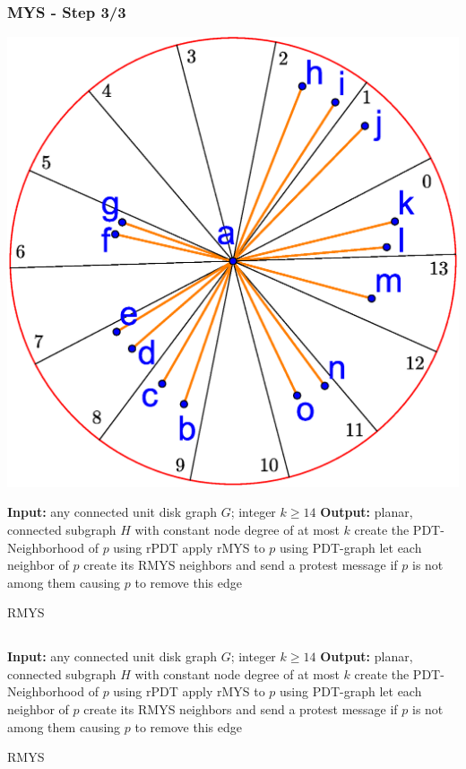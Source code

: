 \documentclass[compress]{beamer}
\begin{document}
\begin{frame} 
\frametitle{MYS - Step 3/3}
	\center \includegraphics[width=0.65\linewidth]{RMYS_3.eps}
\end{frame}

\begin{frame}
\begin{algorithm}[H]
\begin{algorithmic}[0]
\STATE \textbf{Input:} any connected unit disk graph $G $; integer $k\geq 14 $
\STATE \textbf{Output:} planar, connected subgraph $H $ with constant node degree of at most $k $
\STATE create the PDT-Neighborhood of $p $ using rPDT
\STATE apply rMYS to $p $ using PDT-graph
\STATE let each neighbor of $p $ create its RMYS neighbors and send a protest message if $p $ is not among them causing $p $ to remove this edge
\ENDFOR
\end{algorithmic}
\caption{RMYS}
\end{algorithm}
\end{frame}

\subsection{}
\begin{frame}
\begin{algorithm}[H]
\begin{algorithmic}[0]
\STATE \textbf{Input:} any connected unit disk graph $G $; integer $k\geq 14 $
\STATE \textbf{Output:} planar, connected subgraph $H $ with constant node degree of at most $k $
\STATE create the PDT-Neighborhood of $p $ using rPDT
\STATE apply rMYS to $p $ using PDT-graph
\STATE let each neighbor of $p $ create its RMYS neighbors and send a protest message if $p $ is not among them causing $p $ to remove this edge
\ENDFOR
\end{algorithmic}
\caption{RMYS}
\end{algorithm}
\end{frame}
\end{document}
